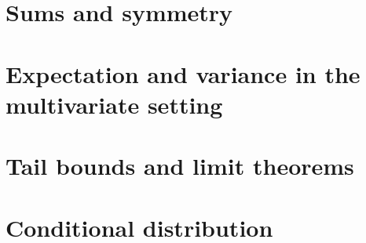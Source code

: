 
\section{Sums and symmetry}
\label{sec:sums-symmetry}


\section{Expectation and variance in the multivariate setting}
\label{sec:expect-vari-mult}


\section{Tail bounds and limit theorems}
\label{sec:tail-bounds-limit}


\section{Conditional distribution}
\label{sec:cond-distr}






